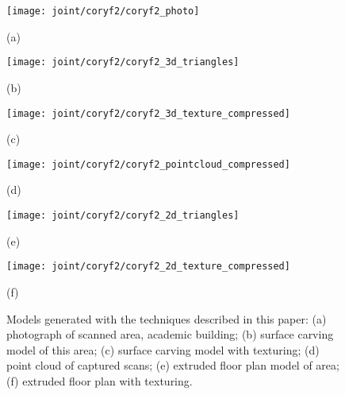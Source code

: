 \documentclass[journal]{IEEEtran}
\begin{document}
\begin{figure*}[t]

	\begin{minipage}[t]{0.30\linewidth}
		\centerline{\texttt{[image: joint/coryf2/coryf2\_photo]}}
		\centerline{(a)}\medskip
	\end{minipage}
	\hfill
	\begin{minipage}[t]{0.30\linewidth}
		\centerline{\texttt{[image: joint/coryf2/coryf2\_3d\_triangles]}}
		\centerline{(b)}\medskip
	\end{minipage}
	\hfill
	\begin{minipage}[t]{0.30\linewidth}
		\centerline{\texttt{[image: joint/coryf2/coryf2\_3d\_texture\_compressed]}}
		\centerline{(c)}\medskip
	\end{minipage}
	
	\begin{minipage}[b]{0.30\linewidth}
		\centerline{\texttt{[image: joint/coryf2/coryf2\_pointcloud\_compressed]}}
		\centerline{(d)}\medskip
	\end{minipage}
	\hfill
	\begin{minipage}[b]{0.30\linewidth}
		\centerline{\texttt{[image: joint/coryf2/coryf2\_2d\_triangles]}}
		\centerline{(e)}\medskip
	\end{minipage}
	\hfill
	\begin{minipage}[b]{0.30\linewidth}
		\centerline{\texttt{[image: joint/coryf2/coryf2\_2d\_texture\_compressed]}}
		\centerline{(f)}\medskip
	\end{minipage}
	
	\caption{Models generated with the techniques described in this paper:  (a) photograph of scanned area, academic building; (b) surface carving model of this area; (c) surface carving model with texturing; (d) point cloud of captured scans; (e) extruded floor plan model of area; (f) extruded floor plan with texturing.}
	\label{fig:coryf2}

\end{figure*}
\end{document}
